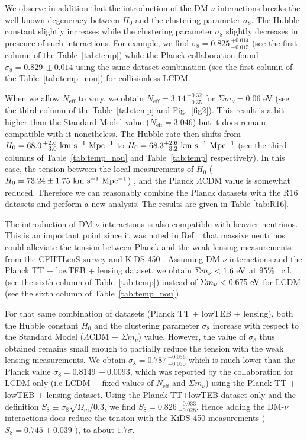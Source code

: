 \documentclass[aps,prd,a4paper,twocolumn,amsmath,showpacs,superscriptaddress,nofootinbib,preprintnumbers]{revtex4-1}
\newcommand{\neff}{N_{\mathrm{eff}}}
\newcommand{\mnu}{{\Sigma}m_{\nu}}
\begin{document}
We observe in addition that the introduction of the DM-$\nu$ interactions breaks the well-known degeneracy between $H_0$ and the clustering parameter $\sigma_8$. The Hubble constant slightly increases while the  clustering parameter $\sigma_8$ slightly decreases in presence of such interactions. 
For example, we find $\sigma_8=0.825\, _{-0.015}^{+0.014}$ (see the first column of the Table~\ref{tab:temp}) while the Planck collaboration found $\sigma_8=0.829\,\pm 0.014$  using 
the same dataset combination (see the first column of the Table~\ref{tab:temp_nou}) for collisionless LCDM.

When we allow $\neff$ to vary, we obtain $\neff=3.14\,_{-0.35}^{+0.32}$ for $\mnu =0.06$ eV (see the third column of the Table~\ref{tab:temp} and Fig.~\ref{fig2}). This result is a bit higher than the Standard Model value ($\neff = 3.046$) but it does remain compatible with it nonetheless. The Hubble rate then shifts from $H_0 = 68.0\,^{+2.6}_{-3.0} \ \rm{km \ s^{-1} \ Mpc^{-1} }$ to $H_0 = 68.3^{+2.6}_{-3.2} \ \rm{km \ s^{-1} \ Mpc^{-1}}$ (see the third columns of  Table~\ref{tab:temp_nou} and Table~\ref{tab:temp} respectively). In this case, the tension between the local measurements of $H_0$ ($H_0=73.24 \pm 1.75 \ \rm{km \ s^{-1} \ Mpc^{-1}}$) \cite{R16}, and the Planck $\Lambda$CDM value \cite{planck2015} is somewhat reduced. Therefore we can reasonably combine the Planck datasets with the R16 datasets and perform a new analysis. The results are given in Table \ref{tab:R16}. 

The introduction of DM-$\nu$ interactions is also compatible with  heavier neutrinos. This is an important point since it was noted in Ref.~\cite{Giusarma:2014zza,sigma8,DiValentino:2015sam} that massive neutrinos could alleviate the tension between Planck and the weak lensing measurements from the CFHTLenS survey \cite{Heymans:2012gg, Erben:2012zw} and KiDS-450 \cite{Hildebrandt:2016iqg}.  Assuming DM-$\nu$ interactions and the Planck TT + lowTEB + lensing dataset, we obtain $\mnu < 1.6 \ \rm{eV}$ at $95\%$~ c.l.  (see the sixth column of  Table~\ref{tab:temp}) instead of $\mnu<0.675 \ \rm{eV}$ for LCDM (see the sixth column of Table~\ref{tab:temp_nou}). 

For that same combination of datasets (Planck TT + lowTEB + lensing), both the Hubble constant $H_0$ and the clustering parameter $\sigma_8$ increase with respect to the Standard Model ($\Lambda$CDM + $\mnu$) value. However, the value of $\sigma_8$ thus obtained remains small enough to partially reduce the tension with the weak lensing measurements. We obtain $\sigma_8 = 0.787\,^{+0.036}_{-0.030}$ which is much lower than the Planck value  $\sigma_8= 0.8149\,\pm0.0093$, which was reported by the collaboration for LCDM  only (i.e LCDM $+$ fixed values of $\neff$ and $\mnu$) using the Planck TT + lowTEB + lensing dataset. 
Using the Planck TT+lowTEB dataset only and the definition $S_8 \equiv\sigma_8 \sqrt{\Omega_m/0.3}$, we find  $S_8 =0.826\, _{-0.028}^{+0.033}$. Hence adding the DM-$\nu$ interactions does reduce the tension with the KiDS-450 measurements ($S_8=0.745\pm0.039$ \cite{Hildebrandt:2016iqg}), to about $1.7\sigma$.
\end{document}
